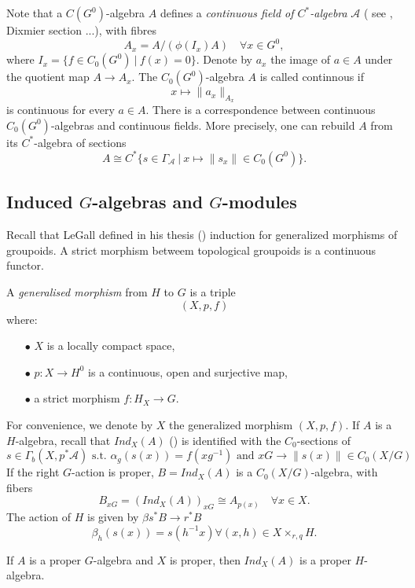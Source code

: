 Note that a $C(G^0)$-algebra $A$ defines a \textit{continuous field of $C^*$-algebra} $\mathcal A$ ( see \cite{}, Dixmier section ...), with fibres
\[A_x = A/(\phi(I_x )A) \quad \forall x\in G^0,\]
where $I_x= \{ f\in C_0(G^0) \ | \ f(x)=0\}$. Denote by $a_x$ the image of $a\in A$ under the quotient map $A\rightarrow A_x$. The $C_0(G^0)$-algebra $A$ is called continnous if 
\[x \mapsto \|a_x\|_{A_x} \]
is continuous for every $a\in A$. There is a correspondence between continuous $C_0(G^0)$-algebras and continuous fields. More precisely, one can rebuild $A$ from its $C^*$-algebra of sections
\[A\cong C^*\{ s\in \Gamma_{\mathcal A} \ | \ x\mapsto \| s_x\| \in C_0(G^0)\}.\]  

\subsection{Induced $G$-algebras and $G$-modules}

Recall that LeGall defined in his thesis (\cite{LeGall}) induction for generalized morphisms of groupoids. A strict morphism betweem topological groupoids is a continuous functor. 

\begin{definition}
A \textit{generalised morphism}  from $H$ to $G$ is a triple
\[(X,p,f)\]
where:
\begin{itemize}
\item[$\bullet$] $X$ is a locally compact space,
\item[$\bullet$] $p: X\rightarrow H^0$ is a continuous, open and surjective map, 
\item[$\bullet$] a strict morphism $f: H_X \rightarrow G$.
\end{itemize}
\end{definition}

For convenience, we denote by $X$ the generalized morphism $(X,p,f)$. If $A$ is a $H$-algebra, recall that $Ind_X (A)$ (\cite{Bonicke}\cite{DellBonicke}) is identified with the $C_0$-sections of 
\[s\in \Gamma_b(X,p^*\mathcal A) \text{ s.t. } \alpha_g(s(x))= f(xg^{-1})  \text{ and } xG\rightarrow \|s(x)\| \in C_0(X/G) \]
If the right $G$-action is proper, $B=Ind_X(A)$ is a $C_0(X/G)$-algebra, with fibers
\[ B_{xG}  = \left( Ind_X(A) \right)_{xG} \cong A_{p(x)} \quad \forall x\in X.\]
The action of $H$ is given by $\beta s^* B \rightarrow r^* B$
\[\beta_h (s(x)) = s(h^{-1}x) \forall (x, h )\in X\times_{r,q} H.\]

\begin{lem}
If $A$ is a proper $G$-algebra and $X$ is proper, then $Ind_X(A)$ is a proper $H$-algebra.
\end{lem}

